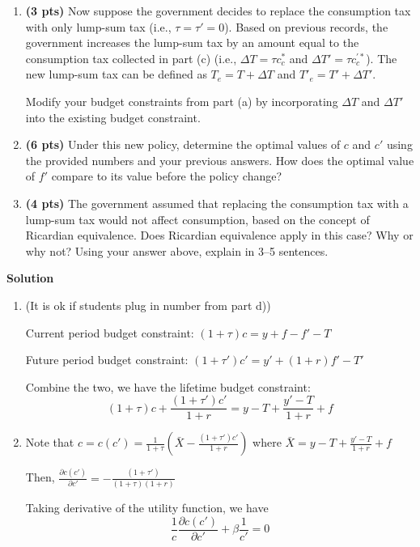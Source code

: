 \documentclass[14pt, oneside]{memoir}
\begin{document}
\begin{enumerate}[label=\textbf{\arabic*.}, itemsep=15pt]
\begin{enumerate}[label=(\alph*)]
	\clearpage
	
	\item \textbf{(3 pts)} Now suppose the government decides to replace the consumption tax with only lump-sum tax (i.e., $\tau=\tau'=0$). Based on previous records, the government increases the lump-sum tax by an amount equal to the consumption tax collected in part (c) (i.e.,  \( \Delta T = \tau c_c^* \)  and \( \Delta T' = \tau c_c^{'*} \)). The new lump-sum tax can be defined as $T_e = T + \Delta T$ and $T'_e=T'+\Delta T'$.
	
	Modify your budget constraints from part (a) by incorporating \( \Delta T \) and \( \Delta T' \) into the existing budget constraint. 
	

	\item \textbf{(6 pts)} Under this new policy, determine the optimal values of \( c \) and \( c' \) using the provided numbers and your previous answers. How does the optimal value of \( f' \) compare to its value before the policy change?
	
	
	\item \textbf{(4 pts)} The government assumed that replacing the consumption tax with a lump-sum tax would not affect consumption, based on the concept of Ricardian equivalence. Does Ricardian equivalence apply in this case? Why or why not? Using your answer above, explain in 3–5 sentences.
\end{enumerate}



\vfill

\newpage

\textbf{Solution}
\begin{enumerate}
	\item (It is ok if students plug in number from part d)) 
	
	Current period budget constraint: $(1+\tau)c = y+f-f' -T $
	
	Future period budget constraint: $(1+\tau')c'= y'+(1+r)f' -T'$
	
	Combine the two, we have the lifetime budget constraint:
	\[(1+\tau)c +\frac{(1+\tau')c'}{1+r} = y- T + \frac{y'-T}{1+r} +f\]
	\item
	Note that $c=c(c') = \frac{1}{1+\tau}\left(\bar{X} - \frac{(1+\tau')c'}{1+r} \right)$ where $\bar{X} = y- T + \frac{y'-T}{1+r} +f$
	
	Then, $\frac{\partial c(c')}{\partial c'} = - \frac{(1+\tau')}{(1+\tau) (1+r)} $
	
	Taking derivative of the utility function, we have
	\[\frac{1}{c} \frac{\partial c(c')}{\partial c'} + \beta\frac{1}{c'} = 0  \]
	

\end{enumerate}
\end{enumerate}
\end{document}
